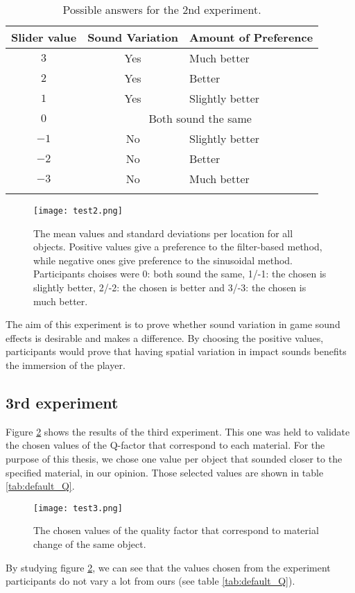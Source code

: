 \begin{table}[H]
	\centering
    \begin{tabular}{  c  c  l  }
    \toprule
    \textbf{Slider value} & \textbf{Sound Variation} & \textbf{Amount of Preference} \\ \toprule
    \addlinespace
    $3$ & Yes & Much better \\ 
    $2$ & Yes & Better \\ 
    $1$ & Yes & Slightly better \\ 
    \addlinespace
    $0$ & \multicolumn{2}{c}{Both sound the same} \\ 
    \addlinespace
    $-1$ & No & Slightly better \\ 
    $-2$ & No & Better \\ 
    $-3$ & No & Much better \\
    \addlinespace
    \bottomrule
    \end{tabular}
    \caption{Possible answers for the 2nd experiment.}
    \label{tab:test2_ans}
\end{table}

\begin{figure}[H]
  \centering
    \texttt{[image: test2.png]}
      \caption{The mean values and standard deviations per location for all objects. Positive values give a preference to the filter-based method, while negative ones give preference to the sinusoidal method. Participants choises were 0: both sound the same, 1/-1: the chosen is slightly better, 2/-2: the chosen is better and 3/-3: the chosen is much better.}\label{fig:test2}
\end{figure}

The aim of this experiment is to prove whether sound variation in game sound effects is desirable and makes a difference. By choosing the positive values, participants would prove that having spatial variation in impact sounds benefits the immersion of the player. 

\subsection{3rd experiment}

Figure \ref{fig:test3} shows the results of the third experiment. This one was held to validate the chosen values of the Q-factor that correspond to each material. For the purpose of this thesis, we chose one value per object that sounded closer to the specified material, in our opinion. Those selected values are shown in table \ref{tab:default_Q}.   

\begin{figure}[H]
  \centering
    \texttt{[image: test3.png]}
      \caption{The chosen values of the quality factor that correspond to material change of the same object.}\label{fig:test3}
\end{figure}

By studying figure \ref{fig:test3}, we can see that the values chosen from the experiment participants do not vary a lot from ours (see table \ref{tab:default_Q}).